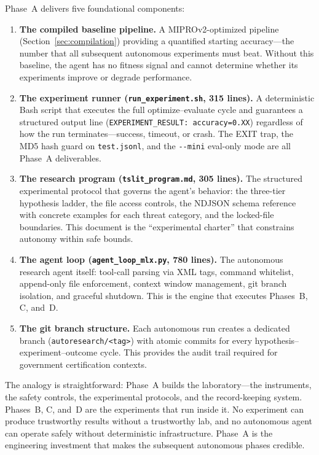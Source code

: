 \documentclass[11pt]{article}
\begin{document}
Phase~A delivers five foundational components:

\begin{enumerate}[leftmargin=2em]
  \item \textbf{The compiled baseline pipeline.} A MIPROv2-optimized
  pipeline (Section~\ref{sec:compilation}) providing a quantified
  starting accuracy---the number that all subsequent autonomous
  experiments must beat. Without this baseline, the agent has no
  fitness signal and cannot determine whether its experiments improve
  or degrade performance.

  \item \textbf{The experiment runner (\texttt{run\_experiment.sh}, 315
  lines).} A deterministic Bash script that executes the full
  optimize--evaluate cycle and guarantees a structured output line
  (\texttt{EXPERIMENT\_RESULT: accuracy=0.XX}) regardless of how the
  run terminates---success, timeout, or crash. The EXIT trap, the MD5
  hash guard on \texttt{test.jsonl}, and the \texttt{-{}-mini} eval-only
  mode are all Phase~A deliverables.

  \item \textbf{The research program (\texttt{tslit\_program.md}, 305
  lines).} The structured experimental protocol that governs the agent's
  behavior: the three-tier hypothesis ladder, the file access controls,
  the NDJSON schema reference with concrete examples for each threat
  category, and the locked-file boundaries. This document is the
  ``experimental charter'' that constrains autonomy within safe bounds.

  \item \textbf{The agent loop (\texttt{agent\_loop\_mlx.py}, 780 lines).}
  The autonomous research agent itself: tool-call parsing via XML tags,
  command whitelist, append-only file enforcement, context window
  management, git branch isolation, and graceful shutdown. This is the
  engine that executes Phases~B, C, and~D.

  \item \textbf{The git branch structure.} Each autonomous run creates
  a dedicated branch (\texttt{autoresearch/<tag>}) with
  atomic commits for every hypothesis--experiment--outcome cycle.
  This provides the audit trail required for government certification
  contexts.
\end{enumerate}

The analogy is straightforward: Phase~A builds the laboratory---the
instruments, the safety controls, the experimental protocols, and the
record-keeping system. Phases~B, C, and~D are the experiments that run
inside it. No experiment can produce trustworthy results without a
trustworthy lab, and no autonomous agent can operate safely without
deterministic infrastructure. Phase~A is the engineering investment
that makes the subsequent autonomous phases credible.
\end{document}
